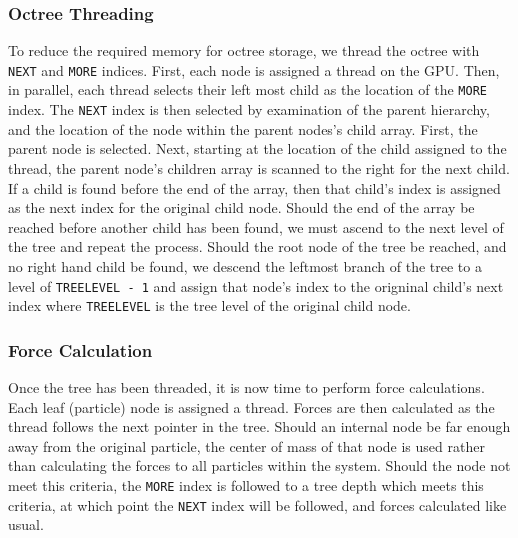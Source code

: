 \documentclass{thesis}
\begin{document}
\begin{algorithmic}
    \EndFor
\end{algorithmic}
\subsubsection{Octree Threading}
To reduce the required memory for octree storage, we thread the octree with \verb|NEXT| and \verb|MORE| indices. First, each node is assigned a thread on the GPU. Then, in parallel, each thread selects their left most child as the location of the \verb|MORE| index. The \verb|NEXT| index is then selected by examination of the parent hierarchy, and the location of the node within the parent nodes's child array. First, the parent node is selected. Next, starting at the location of the child assigned to the thread, the parent node's children array is scanned to the right for the next child. If a child is found before the end of the array, then that child's index is assigned as the next index for the original child node. Should the end of the array be reached before another child has been found, we must ascend to the next level of the tree and repeat the process. Should the root node of the tree be reached, and no right hand child be found, we descend the leftmost branch of the tree to a level of \verb|TREELEVEL - 1| and assign that node's index to the origninal child's next index where \verb|TREELEVEL| is the tree level of the original child node.

\begin{algorithmic}
    \EndFor
\end{algorithmic}
\subsubsection{Force Calculation}
Once the tree has been threaded, it is now time to perform force calculations. Each leaf (particle) node is assigned a thread. Forces are then calculated as the thread follows the next pointer in the tree. Should an internal node be far enough away from the original particle, the center of mass of that node is used rather than calculating the forces to all particles within the system. Should the node not meet this criteria, the \verb|MORE| index is followed to a tree depth which meets this criteria, at which point the \verb|NEXT| index will be followed, and forces calculated like usual.
\end{document}
